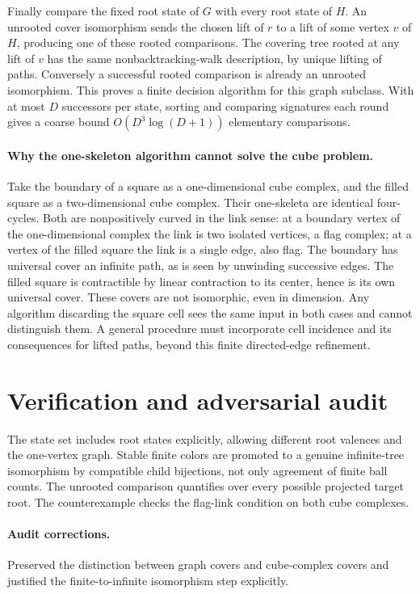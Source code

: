 \documentclass[11pt]{article}
\begin{document}
Finally compare the fixed root state of $G$ with every root state of $H$. An unrooted cover isomorphism sends the chosen lift of $r$ to a lift of some vertex $v$ of $H$, producing one of these rooted comparisons. The covering tree rooted at any lift of $v$ has the same nonbacktracking-walk description, by unique lifting of paths. Conversely a successful rooted comparison is already an unrooted isomorphism. This proves a finite decision algorithm for this graph subclass. With at most $D$ successors per state, sorting and comparing signatures each round gives a coarse bound $O(D^3\log(D+1))$ elementary comparisons.

\paragraph{Why the one-skeleton algorithm cannot solve the cube problem.}
Take the boundary of a square as a one-dimensional cube complex, and the filled square as a two-dimensional cube complex. Their one-skeleta are identical four-cycles. Both are nonpositively curved in the link sense: at a boundary vertex of the one-dimensional complex the link is two isolated vertices, a flag complex; at a vertex of the filled square the link is a single edge, also flag. The boundary has universal cover an infinite path, as is seen by unwinding successive edges. The filled square is contractible by linear contraction to its center, hence is its own universal cover. These covers are not isomorphic, even in dimension. Any algorithm discarding the square cell sees the same input in both cases and cannot distinguish them. A general procedure must incorporate cell incidence and its consequences for lifted paths, beyond this finite directed-edge refinement.
\section{Verification and adversarial audit}
The state set includes root states explicitly, allowing different root valences and the one-vertex graph. Stable finite colors are promoted to a genuine infinite-tree isomorphism by compatible child bijections, not only agreement of finite ball counts. The unrooted comparison quantifies over every possible projected target root. The counterexample checks the flag-link condition on both cube complexes.
\paragraph{Audit corrections.} Preserved the distinction between graph covers and cube-complex covers and justified the finite-to-infinite isomorphism step explicitly.
\end{document}

